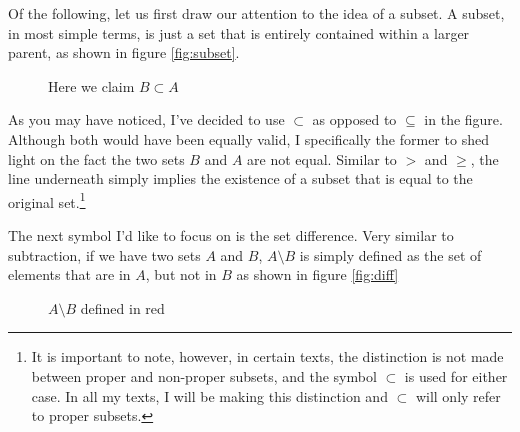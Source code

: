 \documentclass[11pt]{article}
\numberwithin{lemma}{section}
\numberwithin{equation}{section}
\numberwithin{define}{section}
\numberwithin{prop}{section}
\numberwithin{figure}{section}
\numberwithin{theorem}{section}
\newcounter{ex}[section]
\numberwithin{ex}{section}
\begin{document}
Of the following, let us first draw our attention to the idea of a subset. A subset, in most simple terms, is just a set that is entirely contained within a larger parent, as shown in figure \eqref{fig:subset}. 
\begin{figure}[h]
	\centering
	\caption{Here we claim $B\subset A$}
	\label{fig:subset}
\end{figure}
As you may have noticed, I've decided to use $\subset$ as opposed to $\subseteq$ in the figure. Although both would have been equally valid, I specifically the former to shed light on the fact the two sets $B$ and $A$ are not equal. 
Similar to $>$ and $\ge$, the line underneath simply implies the existence of a subset that is equal to the original set.\footnote{It is important to note, however, in certain texts, the distinction is not made between proper and non-proper subsets, and the symbol $\subset$ is used for either case. In all my texts, I will be making this distinction and $\subset$ will only refer to proper subsets.}

The next symbol I'd like to focus on is the set difference. Very similar to subtraction, if we have two sets $A$ and $B$, $A\setminus B$ is simply defined as the set of elements that are in $A$, but not in $B$ as shown in figure \eqref{fig:diff}
\begin{figure}[h]
\centering
{}
	\caption{$A\setminus B$ defined in red}
	\label{fig:diff}
\end{figure}
\end{document}
